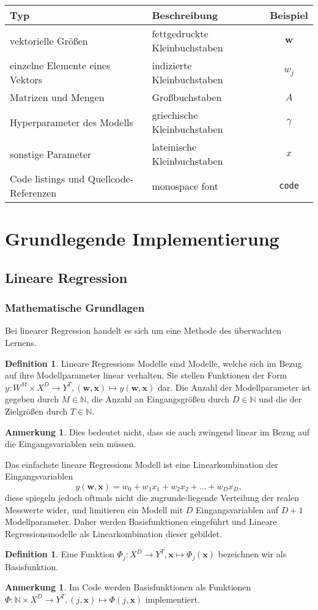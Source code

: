 \documentclass{article}
\theoremstyle{plain} %
\theoremstyle{definition} %
\newtheorem{definition}[theorem]{Definition}
\newtheorem{anno}[theorem]{Anmerkung}
\begin{document}
\begin{tabular}{llc}
  \toprule
  Typ & Beschreibung & Beispiel \\
  \midrule
  vektorielle Größen & fettgedruckte Kleinbuchstaben & $\mathbf{w}$ \\
  einzelne Elemente eines Vektors & indizierte Kleinbuchstaben & $w_j$ \\
  Matrizen und Mengen & Großbuchstaben & $A$ \\
  Hyperparameter des Modells & griechische Kleinbuchstaben & $\gamma$ \\
  sonstige Parameter & lateinische Kleinbuchstaben & $x$ \\
  Code listings und Quellcode-Referenzen & monospace font & \texttt{code} \\
\end{tabular}

\section{Grundlegende Implementierung}
\subsection{Lineare Regression}
\subsubsection{Mathematische Grundlagen}
Bei linearer Regression handelt es sich um eine Methode des überwachten Lernens.
\begin{definition}
  Lineare Regressions Modelle sind Modelle, welche sich im Bezug auf ihre Modellparameter linear verhalten\cite[137f]{Bishop}. Sie stellen Funktionen der Form $y: W^M \times X^D \rightarrow Y^T, (\mathbf{w}, \mathbf{x}) \mapsto y(\mathbf{w}, \mathbf{x})$ dar. Die Anzahl der Modellparameter ist gegeben durch $M \in \mathbb{N}$, die Anzahl an Eingangsgrößen durch $D \in \mathbb{N}$ und die der Zielgrößen durch $T \in \mathbb{N}$.
\end{definition}
\begin{anno}
  Dies bedeutet nicht, dass sie auch zwingend linear im Bezug auf die Eingangsvariablen sein müssen.
\end{anno}

Das einfachste lineare Regressions Modell ist eine Linearkombination der Eingangsvariablen 
$$
  y(\mathbf{w}, \mathbf{x}) = w_0 + w_1x_1 + w_2x_2 + \hdots + w_Dx_D,
$$
diese spiegeln jedoch oftmals nicht die zugrunde-liegende Verteilung der realen Messwerte wider, und limitieren ein Modell mit $D$ Eingangsvariablen auf $D+1$ Modellparameter. Daher werden Basisfunktionen eingeführt und Lineare Regressionsmodelle als Linearkombination dieser gebildet.
\begin{definition}
  Eine Funktion $\Phi_j: X^D \rightarrow Y^T, \mathbf{x} \mapsto \Phi_j(\mathbf{x})$ bezeichnen wir als Basisfunktion.
\end{definition}
\begin{anno}
  Im Code werden Basisfunktionen als Funktionen $\Phi: \mathbb{N} \times X^D \rightarrow Y^T, (j, \mathbf{x}) \mapsto \Phi(j, \mathbf{x})$ implementiert.
\end{anno}
\end{document}
